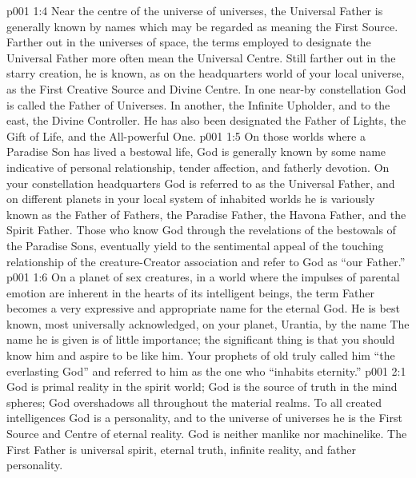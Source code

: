 \vs p001 1:4 \pc Near the centre of the universe of universes, the Universal Father is generally known by names which may be regarded as meaning the First Source. Farther out in the universes of space, the terms employed to designate the Universal Father more often mean the Universal Centre. Still farther out in the starry creation, he is known, as on the headquarters world of your local universe, as the First Creative Source and Divine Centre. In one near-by constellation God is called the Father of Universes. In another, the Infinite Upholder, and to the east, the Divine Controller. He has also been designated the Father of Lights, the Gift of Life, and the All\hyp{}powerful One.
\vs p001 1:5 On those worlds where a Paradise Son has lived a bestowal life, God is generally known by some name indicative of personal relationship, tender affection, and fatherly devotion. On your constellation headquarters God is referred to as the Universal Father, and on different planets in your local system of inhabited worlds he is variously known as the Father of Fathers, the Paradise Father, the Havona Father, and the Spirit Father. Those who know God through the revelations of the bestowals of the Paradise Sons, eventually yield to the sentimental appeal of the touching relationship of the creature\hyp{}Creator association and refer to God as “our Father.”
\vs p001 1:6 On a planet of sex creatures, in a world where the impulses of parental emotion are inherent in the hearts of its intelligent beings, the term Father becomes a very expressive and appropriate name for the eternal God. He is best known, most universally acknowledged, on your planet, Urantia, by the name  The name he is given is of little importance; the significant thing is that you should know him and aspire to be like him. Your prophets of old truly called him “the everlasting God” and referred to him as the one who “inhabits eternity.”
\vs p001 2:1 God is primal reality in the spirit world; God is the source of truth in the mind spheres; God overshadows all throughout the material realms. To all created intelligences God is a personality, and to the universe of universes he is the First Source and Centre of eternal reality. God is neither manlike nor machinelike. The First Father is universal spirit, eternal truth, infinite reality, and father personality.
